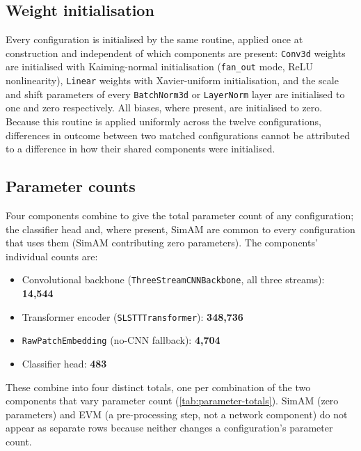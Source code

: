 \subsection{Weight initialisation}
\label{sec:weight-init}

Every configuration is initialised by the same routine, applied once at construction and independent of which components are present: \texttt{Conv3d} weights are initialised with Kaiming-normal initialisation (\texttt{fan\_out} mode, ReLU nonlinearity), \texttt{Linear} weights with Xavier-uniform initialisation, and the scale and shift parameters of every \texttt{BatchNorm3d} or \texttt{LayerNorm} layer are initialised to one and zero respectively. All biases, where present, are initialised to zero. Because this routine is applied uniformly across the twelve configurations, differences in outcome between two matched configurations cannot be attributed to a difference in how their shared components were initialised.

\subsection{Parameter counts}
\label{sec:parameter-counts}

Four components combine to give the total parameter count of any configuration; the classifier head and, where present, SimAM are common to every configuration that uses them (SimAM contributing zero parameters). The components' individual counts are:

\begin{itemize}
	\item Convolutional backbone (\texttt{ThreeStreamCNNBackbone}, all three streams): \textbf{14,544}
	\item Transformer encoder (\texttt{SLSTTTransformer}): \textbf{348,736}
	\item \texttt{RawPatchEmbedding} (no-CNN fallback): \textbf{4,704}
	\item Classifier head: \textbf{483}
\end{itemize}

These combine into four distinct totals, one per combination of the two components that vary parameter count (\autoref{tab:parameter-totals}). SimAM (zero parameters) and EVM (a pre-processing step, not a network component) do not appear as separate rows because neither changes a configuration's parameter count.

